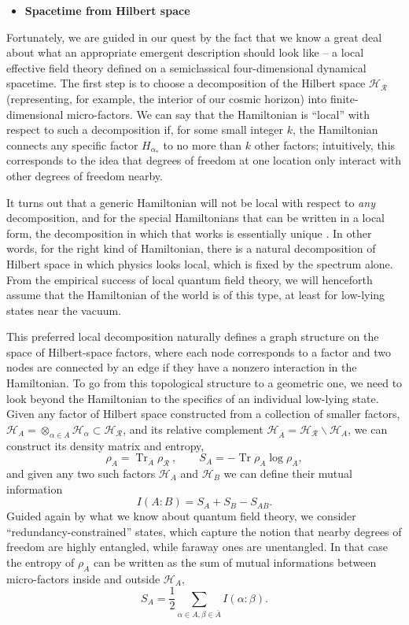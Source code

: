 \documentclass[12pt,english]{article}
\newcommand{\be}{\begin{equation}}
\newcommand{\ee}{\end{equation}}
\newcommand{\Tr}{\operatorname{Tr}}
\newcommand{\HH}{\mathcal{H}}
\DeclareMathOperator{\co}{:}
\newcommand{\R}{\mathcal{R}}
\begin{document}
\begin{itemize}
\item \textbf{Spacetime from Hilbert space}
\end{itemize}

Fortunately, we are guided in our quest by the fact that we know a great deal about what an appropriate emergent description should look like -- a local effective field theory defined on a semiclassical four-dimensional dynamical spacetime.
The first step is to choose a decomposition of the Hilbert space $\HH_\R$ (representing, for example, the interior of our cosmic horizon) into finite-dimensional micro-factors.
We can say that the Hamiltonian is ``local'' with respect to such a decomposition if, for some small integer $k$, the Hamiltonian connects any specific factor $H_{\alpha_*}$ to no more than $k$ other factors; intuitively, this corresponds to the idea that degrees of freedom at one location only interact with other degrees of freedom nearby.

It turns out that a generic Hamiltonian will not be local with respect to \emph{any} decomposition, and for the special Hamiltonians that can be written in a local form, the decomposition in which that works is essentially unique \cite{Cotler:2017abq}.
In other words, for the right kind of Hamiltonian, there is a natural decomposition of Hilbert space in which physics looks local, which is fixed by the spectrum alone. 
From the empirical success of local quantum field theory, we will henceforth assume that the Hamiltonian of the world is of this type, at least for low-lying states near the vacuum.

This preferred local decomposition naturally defines a graph structure on the space of Hilbert-space factors, where each node corresponds to a factor and two nodes are connected by an edge if they have a nonzero interaction in the Hamiltonian.
To go from this topological structure to a geometric one, we need to look beyond the Hamiltonian to the specifics of an individual low-lying state.
Given any factor of Hilbert space constructed from a collection of smaller factors, $\HH_A = \otimes_{\alpha \in A} \HH_\alpha \subset \HH_\R$, and its relative complement $\HH_{\bar A} = \HH_\R \backslash \HH_A$, we can construct its density matrix and entropy,
\be
  \rho_A = \Tr_{\bar A} \rho_\R\ ,\qquad S_A = - \Tr \rho_A \log \rho_A,
\ee
and given any two such factors $\HH_A$ and $\HH_B$ we can define their mutual information
\be
  I(A\co B) = S_A + S_B - S_{AB}.
\ee
Guided again by what we know about quantum field theory, we consider ``redundancy-constrained'' states, which capture the notion that nearby degrees of freedom are highly entangled, while faraway ones are unentangled.
In that case the entropy of $\rho_A$ can be written as the sum of mutual informations between micro-factors inside and outside $\HH_A$,
\be
  S_A = \frac{1}{2} \sum_{\alpha\in A, \beta \in \bar A} I(\alpha \co \beta).
\ee
\end{document}
